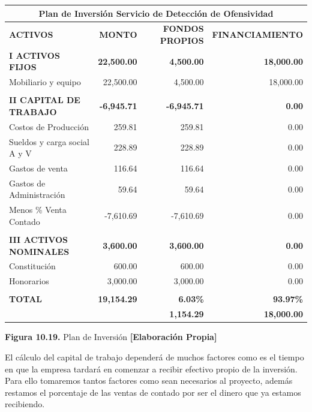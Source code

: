 \begin{table}[H]
\centering
\scriptsize
\renewcommand{\arraystretch}{1.15}
\setlength{\tabcolsep}{7pt}
\begin{tabular}{|l|r|r|r|}
\hline
\multicolumn{4}{|c|}{\textbf{Plan de Inversión Servicio de Detección de Ofensividad}} \\ \hline
\textbf{ACTIVOS} & \textbf{MONTO} & \textbf{FONDOS PROPIOS} & \textbf{FINANCIAMIENTO} \\ \hline
\textbf{I ACTIVOS FIJOS} & \textbf{22,500.00} & \textbf{4,500.00} & \textbf{18,000.00} \\ \hline
Mobiliario y equipo & 22,500.00 & 4,500.00 & 18,000.00 \\ \hline
 &  &  &  \\[-0.25cm] \hline
\textbf{II CAPITAL DE TRABAJO} & \textbf{-6,945.71} & \textbf{-6,945.71} & \textbf{0.00} \\ \hline
Costos de Producción & 259.81 & 259.81 & 0.00 \\ \hline
Sueldos y carga social A y V & 228.89 & 228.89 & 0.00 \\ \hline
Gastos de venta & 116.64 & 116.64 & 0.00 \\ \hline
Gastos de Administración & 59.64 & 59.64 & 0.00 \\ \hline
Menos \% Venta Contado & -7,610.69 & -7,610.69 & 0.00 \\ \hline
 &  &  &  \\[-0.25cm] \hline
\textbf{III ACTIVOS NOMINALES} & \textbf{3,600.00} & \textbf{3,600.00} & \textbf{0.00} \\ \hline
Constitución & 600.00 & 600.00 & 0.00 \\ \hline
Honorarios & 3,000.00 & 3,000.00 & 0.00 \\ \hline
 &  &  &  \\[-0.25cm] \hline
\textbf{TOTAL} & \textbf{19,154.29} & \textbf{6.03\%} & \textbf{93.97\%} \\ \hline
 &  & \textbf{1,154.29} & \textbf{18,000.00} \\ \hline
\end{tabular}

\vspace{0.2cm}
\textbf{Figura 10.19.} Plan de Inversión \textbf{[Elaboración Propia]}
\end{table}

El cálculo del capital de trabajo dependerá de muchos factores como es el tiempo en que la empresa tardará en comenzar a recibir efectivo propio de la inversión. Para ello tomaremos tantos factores como sean necesarios al proyecto, además restamos el porcentaje de las ventas de contado por ser el dinero que ya estamos recibiendo.
